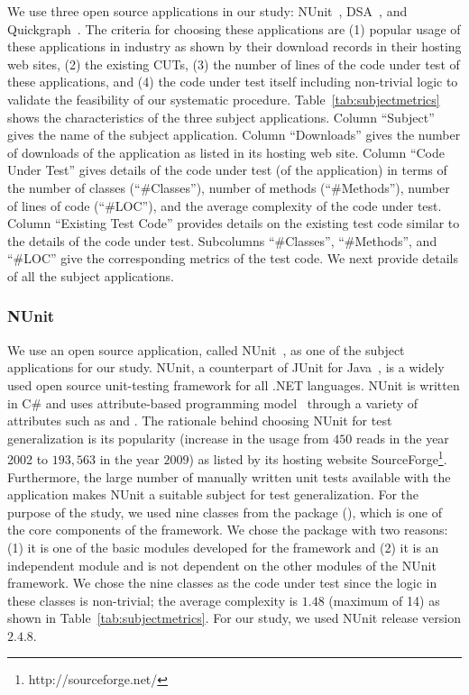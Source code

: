 We use three open source applications in our study: NUnit~\cite{nunit}, DSA~\cite{dsa}, and Quickgraph~\cite{quickgraph}. The criteria for choosing these applications are (1) popular usage of these applications in industry as shown by their download records in their hosting web sites, (2) the existing CUTs, (3) the number of lines of the code under test of these applications, and (4) the code under test itself including non-trivial logic to validate the feasibility of our systematic procedure. Table~\ref{tab:subjectmetrics} shows the characteristics of the three subject applications. Column ``Subject'' gives the name of the subject application. Column ``Downloads'' gives the number of downloads of the application as listed in its hosting web site. Column ``Code Under Test'' gives details of the code under test (of the application) in terms of the number of classes (``\#Classes''), number of methods (``\#Methods''), number of lines of code (``\#LOC''), and the average complexity of the code under test. Column ``Existing Test Code'' provides details on the existing test code similar to the details of the code under test. Subcolumns ``\#Classes'', ``\#Methods'', and ``\#LOC'' give the corresponding metrics of the test code. We next provide details of all the subject applications.

\subsubsection{NUnit}
\label{sec:nunit}
We use an open source application, called NUnit~\cite{nunit}, as one of the subject applications for our study. NUnit, a counterpart of JUnit for Java~\cite{JUnit}, is a widely used open source unit-testing framework for all .NET languages. NUnit is written in C\# and uses attribute-based programming model~\cite{TDD} through a variety of attributes such as \CodeIn{[TestFixture]} and \CodeIn{[Test]}. The rationale behind choosing NUnit for test generalization is its popularity  (increase in the usage from $450$ reads in the year 2002 to $193,563$ in the year $2009$) as listed by its hosting website SourceForge\footnote{http://sourceforge.net/}. Furthermore, the large number of manually written unit tests available with the application makes NUnit a suitable subject for test generalization. For the purpose of the study, we used nine classes from the  package (), which is one of the core components of the framework. We chose the  package with two reasons: (1) it is one of the basic modules developed for the framework and (2) it is an independent module and is not dependent on the other modules of the NUnit framework. We chose the nine classes as the code under test since the logic in these classes is non-trivial; the average complexity is $1.48$ (maximum of 14) as shown in Table~\ref{tab:subjectmetrics}. For our study, we used NUnit release version $2.4.8$. 

